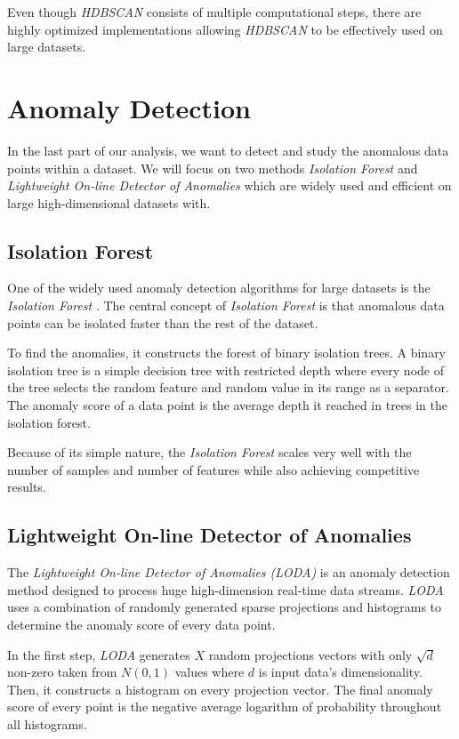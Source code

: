 Even though \textit{HDBSCAN} consists of multiple computational steps, there are highly optimized implementations \cite{vis:hdbscan-imp} allowing \textit{HDBSCAN} to be effectively used on large datasets.

\section{Anomaly Detection}
In the last part of our analysis, we want to detect and study the anomalous data points within a dataset. We will focus on two methods \textit{Isolation Forest} and \textit{Lightweight On-line Detector of Anomalies} which are widely used and efficient on large high-dimensional datasets with.

\subsection{Isolation Forest}
One of the widely used anomaly detection algorithms for large datasets is the \textit{Isolation Forest} \cite{vis:isoforest}. The central concept of \textit{Isolation Forest} is that anomalous data points can be isolated faster than the rest of the dataset. 

To find the anomalies, it constructs the forest of binary isolation trees. A binary isolation tree is a simple decision tree with restricted depth where every node of the tree selects the random feature and random value in its range as a separator. The anomaly score of a data point is the average depth it reached in trees in the isolation forest.

Because of its simple nature, the \textit{Isolation Forest} scales very well with the number of samples and number of features while also achieving competitive results.

\subsection{Lightweight On-line Detector of Anomalies}
The \textit{Lightweight On-line Detector of Anomalies (LODA)} is an anomaly detection method designed to process huge high-dimension real-time data streams. \textit{LODA} uses a combination of randomly generated sparse projections and histograms to determine the anomaly score of every data point.

In the first step, \textit{LODA} generates $X$ random projections vectors with only $\sqrt{d}$ non-zero taken from $N(0, 1)$ values where $d$ is input data's dimensionality. Then, it constructs a histogram on every projection vector. The final anomaly score of every point is the negative average logarithm of probability throughout all histograms.

